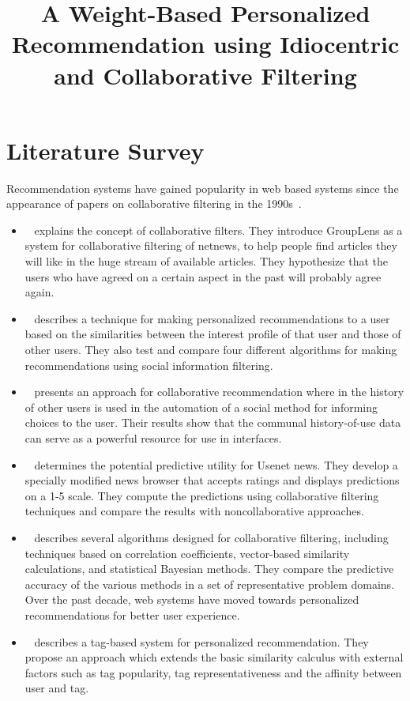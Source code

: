 \documentclass[11pt]{article}
\title{\textbf{A Weight-Based Personalized Recommendation using
 Idiocentric and Collaborative Filtering}}
\date{}
\begin{document}
\maketitle
\section{Literature Survey}
\label{sec:literatureSurvey}
Recommendation systems have gained popularity in web based systems since the appearance of papers on collaborative filtering in the 1990s~\cite{resnick, shardanand, hill}.\\
\begin{itemize}
 \item ~\cite{resnick} explains the concept of collaborative filters. They introduce GroupLens as a system for collaborative filtering of netnews, to help people find articles they will like in the huge stream of available articles. They hypothesize that the users who have agreed on a certain aspect in the past will probably agree again.
 \item ~\cite{shardanand} describes a technique for making personalized recommendations to a user based on the similarities between the interest profile of that user and those of other users. They also test and compare four different algorithms for making recommendations using social information filtering.
 \item ~\cite{hill} presents an approach for collaborative recommendation where in the history of other users is used in the automation of a social method for informing choices to the user. Their results show that the communal history-of-use data can serve as a powerful resource for use in interfaces.
 \item ~\cite{konstan} determines the potential predictive utility for Usenet news. They develop a specially modified news browser that accepts ratings and displays predictions on a 1-5 scale. They compute the predictions using collaborative filtering techniques and compare the results with noncollaborative approaches.
 \item ~\cite{breese} describes several algorithms designed for collaborative filtering, including techniques based on correlation coefficients, vector-based similarity calculations, and statistical Bayesian methods. They compare the predictive accuracy of the various methods in a set of representative problem domains. Over the past decade, web systems have moved towards personalized recommendations for better user experience.
 \item ~\cite{durao} describes a tag-based system for personalized recommendation. They propose an approach which extends the basic similarity calculus with external factors such as tag popularity, tag representativeness and the affinity between user and tag.

\end{itemize}
\end{document}

